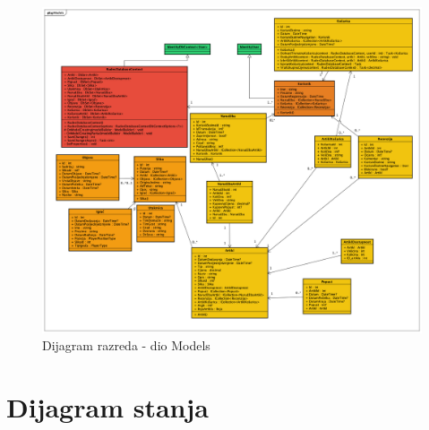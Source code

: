 		\begin{figure}[H]
			\includegraphics[width=\linewidth]{dijagrami/DijagramRazredaModels.png}
			\centering
			\caption{Dijagram razreda - dio Models}
			\label{fig:ClassDiagram1}
		\end{figure}
			
			
			
			
			
			
			
			\eject
		
		\section{Dijagram stanja}
			
			
			
